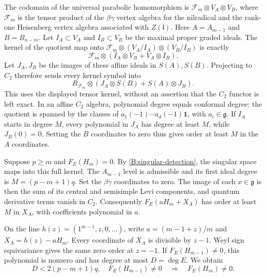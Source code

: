 \documentclass[11pt,a4paper]{amsart}
\numberwithin{equation}{section}
\theoremstyle{definition}
\theoremstyle{remark}
\newcommand{\g}{\mathfrak g}
\newcommand{\lev}{\mathfrak l}
\begin{document}
The codomain of the universal parabolic homomorphism is
$\mathcal F_m\otimes V_A\otimes V_B$, where $\mathcal F_m$ is the
tensor product of the $\beta\gamma$ vertex algebra for the
nilradical and the rank-one Heisenberg vertex algebra associated
with $Z(\lev)$. Here $A=A_{m-1}$ and $B=B_{n-m}$.
Let $I_A\subset V_A$ and $I_B\subset V_B$ be the maximal proper graded
ideals. The kernel of the quotient map onto
$\mathcal F_m\otimes(V_A/I_A)\otimes(V_B/I_B)$ is exactly
$$
 \mathcal F_m\otimes
 (I_A\otimes V_B+V_A\otimes I_B).
$$
Let $J_A,J_B$ be the images of these affine ideals in
$S(A),S(B)$. Projecting to $C_2$ therefore sends every kernel symbol into
$$
 R_{\mathcal F_m}\otimes
 (J_A\otimes S(B)+S(A)\otimes J_B).
$$
This uses the displayed tensor kernel, without an assertion that the
$C_2$ functor is left exact. In an affine $C_2$ algebra, polynomial
degree equals conformal degree: the quotient is spanned by the
classes of $a_1(-1)\cdots a_d(-1)\mathbf1$, with $a_i\in\g$.
If $I_A$ starts in degree $M$, every polynomial in $J_A$ has degree
at least $M$, while $J_B(0)=0$. Setting the $B$ coordinates to zero
thus gives order at least $M$ in the $A$ coordinates.

Suppose $p\ge m$ and $F_E(H_m)=0$. By
\cref{B:singular-detection}, the singular space maps into this full
kernel. The $A_{m-1}$ level is admissible and its first ideal degree is
$M=(p-m+1)q$. Set the $\beta\gamma$ coordinates to zero. The image of each $x\in\g$ is then the sum of its central and
semisimple Levi components, and
quantum derivative terms vanish in $C_2$. Consequently
$F_E(aH_m+X_A)$ has order at least $M$ in $X_A$, with coefficients
polynomial in $a$.

On the line $h(z)=(1^{m-1},z,0,\ldots)$, write
$a=(m-1+z)/m$ and $X_A=h(z)-aH_m$. Every coordinate of $X_A$ is
divisible by $z-1$. Weyl sign equivariance gives the same zero order
at $z=-1$. If $F_E(H_{m-1})\ne0$, this polynomial is nonzero and has
degree at most $D=\deg E$. We obtain
\begin{equation}\label{B:forward-propagation}
 D<2(p-m+1)q,\quad F_E(H_{m-1})\ne0
 \quad\Longrightarrow\quad F_E(H_m)\ne0.
\end{equation}
\end{document}
